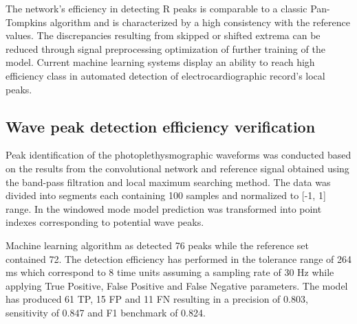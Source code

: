 \documentclass[journal]{IEEEtran}
\begin{document}
\newpage
The network's efficiency in detecting R peaks is comparable to a classic Pan-Tompkins algorithm and is characterized by a high consistency with the reference values. The discrepancies resulting from skipped or shifted extrema can be reduced through signal preprocessing optimization of further training of the model. Current machine learning systems display an ability to reach high efficiency class in automated detection of electrocardiographic record's local peaks.

\subsection{Wave peak detection efficiency verification}
Peak identification of the photoplethysmographic waveforms was conducted based on the results from the convolutional network and reference signal obtained using the band-pass filtration and local maximum searching method. The data was divided into segments each containing 100 samples and normalized to [-1, 1] range. In the windowed mode model prediction was transformed into point indexes corresponding to potential wave peaks.

Machine learning algorithm as detected 76 peaks while the reference set contained 72. The detection efficiency has performed in the tolerance range of 264 ms which correspond to 8 time units assuming a sampling rate of 30 Hz while applying True Positive, False Positive and False Negative parameters. The model has produced 61 TP, 15 FP and 11 FN resulting in a precision of 0.803, sensitivity of 0.847 and F1 benchmark of 0.824.
\end{document}
